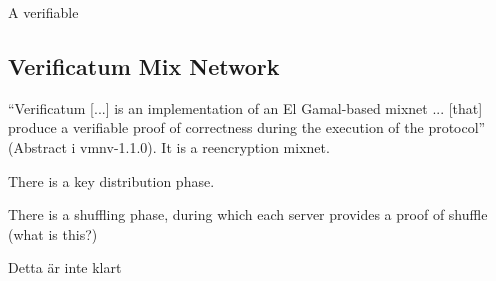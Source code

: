 A verifiable 

\subsection{Verificatum Mix Network}

``Verificatum [...] is an implementation of an El Gamal-based mixnet
... [that] produce a verifiable proof of correctness during the
execution of the protocol'' (Abstract i vmnv-1.1.0). It is a
reencryption mixnet.

There is a key distribution phase.

There is a shuffling phase, during which each server provides a proof
of shuffle (what is this?)

Detta är inte klart


